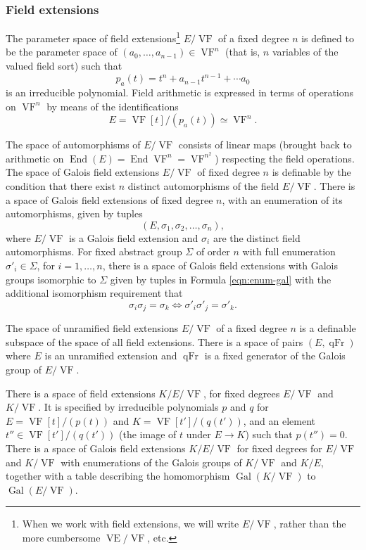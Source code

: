 \documentclass[12pt]{amsart}
\newcommand{\op}[1]{\operatorname{#1}}
\def\VF{{\op{VF}}}
\theoremstyle{plain}
\theoremstyle{definition}
\begin{document}
\subsubsection{Field extensions}

The parameter space of field extensions\footnote{When we work with
  field extensions, we will write $E/\VF$, rather than the more
  cumbersome $\op{VE}/\VF$, etc.} $E/\VF$ of a fixed degree $n$ is defined
to be the parameter space of $(a_0,\ldots,a_{n-1})\in \VF^n$ (that is,
$n$ variables of the valued field sort) such that
\[
p_a(t) = t^n + a_{n-1} t^{n-1} + \cdots a_0
\]
is an irreducible polynomial.  Field arithmetic is expressed in terms
of operations on $\VF^n$ by means of the identifications
\[
E = \VF[t]/(p_a(t)) \simeq \VF^n.
\]

The space of automorphisms of $E/\VF$ consists of linear maps (brought
back to arithmetic on $\op{End}(E) = \op{End}{\VF^n} = \VF^{n^2}$)
respecting the field operations.  The space of Galois field extensions
$E/\VF$ of fixed degree $n$ is definable by the condition that there
exist $n$ distinct automorphisms of the field $E/\VF$.  There is a
space of Galois field extensions of fixed degree $n$, with an
enumeration of its automorphisms, given by tuples
\begin{equation}\label{eqn:enum-gal}
(E,\sigma_1,\sigma_2,\ldots,\sigma_n),
\end{equation}
where $E/\VF$ is a Galois field extension and $\sigma_i$ are the
distinct field automorphisms.  For fixed abstract group $\Sigma$ of
order $n$ with full enumeration $\sigma'_i\in \Sigma$, for
$i=1,\ldots,n$, there is a space of Galois field extensions with
Galois groups isomorphic to $\Sigma$ given by tuples in Formula
\ref{eqn:enum-gal} with the additional isomorphism requirement that
\[
\sigma_i\sigma_j = \sigma_k \Longleftrightarrow \sigma'_i\sigma'_j =
\sigma'_k.
\]

The space of unramified field extensions $E/\VF$ of a fixed degree $n$
is a definable subspace of the space of all field extensions.  There
is a space of pairs $(E,\op{qFr})$ where $E$ is an unramified extension
and $\op{qFr}$ is a fixed generator of the Galois group of $E/\VF$.  

There is a space of field extensions $K/E/\VF$, for fixed degrees
$E/\VF$ and $K/\VF$.  It is specified by irreducible polynomials
$p$ and $q$ for $E = \VF[t]/(p(t))$ and $K = \VF[t']/(q(t'))$, and an
element $t''\in \VF[t']/(q(t'))$ (the image of $t$ under $E\to K$) such
that $p(t'') = 0$.  There is a space of Galois field extensions
$K/E/\VF$ for fixed degrees for $E/\VF$ and $K/\VF$ with enumerations
of the Galois groups of $K/\VF$ and $K/E$, together with a table
describing the homomorphism $\op{Gal}(K/\VF)$ to $\op{Gal}(E/\VF)$.
\end{document}
